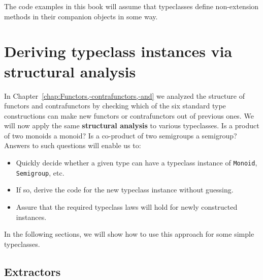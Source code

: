 The code examples in this book will assume that typeclasses define
non-extension methods in their companion objects in some way.

\section{Deriving typeclass instances via structural analysis}

In Chapter~\ref{chap:Functors,-contrafunctors,-and} we analyzed
the structure of functors and contrafunctors by checking which of
the six standard type constructions can make new functors or contrafunctors
out of previous ones. We will now apply the same
\textbf{structural analysis} to
various typeclasses. Is a product of two monoids a monoid? Is a co-product
of two semigroups a semigroup? Answers to such questions will enable
us to:
\begin{itemize}
\item Quickly decide whether a given type can have a typeclass instance
of \lstinline!Monoid!, \lstinline!Semigroup!, etc.
\item If so, derive the code for the new typeclass instance without guessing.
\item Assure that the required typeclass laws will hold for newly constructed
instances.
\end{itemize}
In the following sections, we will show how to use this approach for
some simple typeclasses.

\subsection{Extractors}

